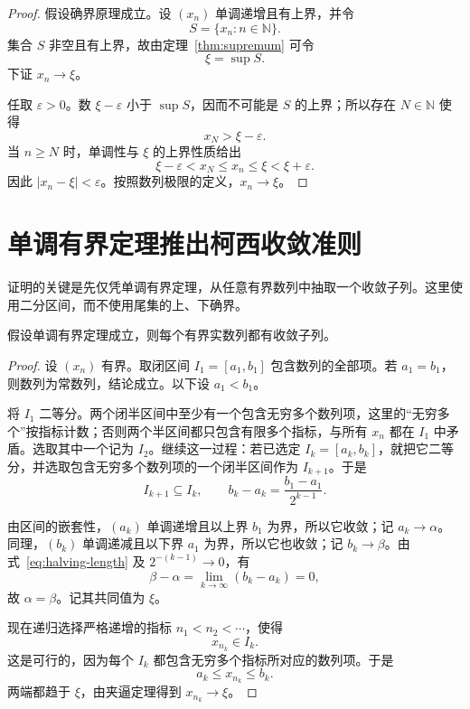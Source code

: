 \documentclass[UTF8,12pt,a4paper,fontset=fandol]{ctexart}
\begin{document}
\begin{proof}
  假设确界原理成立。设 $(x_n)$ 单调递增且有上界，并令
  \[
    S=\{x_n:n\in\mathbb N\}.
  \]
  集合 $S$ 非空且有上界，故由定理~\ref{thm:supremum} 可令
  \[
    \xi=\sup S.
  \]
  下证 $x_n\to\xi$。

  任取 $\varepsilon>0$。数 $\xi-\varepsilon$ 小于 $\sup S$，因而不可能是 $S$ 的上界；所以存在 $N\in\mathbb N$ 使得
  \[
    x_N>\xi-\varepsilon.
  \]
  当 $n\geq N$ 时，单调性与 $\xi$ 的上界性质给出
  \[
    \xi-\varepsilon<x_N\leq x_n\leq\xi<\xi+\varepsilon.
  \]
  因此 $|x_n-\xi|<\varepsilon$。按照数列极限的定义，$x_n\to\xi$。
\end{proof}

\section{单调有界定理推出柯西收敛准则}

证明的关键是先仅凭单调有界定理，从任意有界数列中抽取一个收敛子列。这里使用二分区间，而不使用尾集的上、下确界。

\begin{lemma}[有界数列的收敛子列]
  \label{lem:bounded-subsequence}
  假设单调有界定理成立，则每个有界实数列都有收敛子列。
\end{lemma}

\begin{proof}
  设 $(x_n)$ 有界。取闭区间 $I_1=[a_1,b_1]$ 包含数列的全部项。若 $a_1=b_1$，则数列为常数列，结论成立。以下设 $a_1<b_1$。

  将 $I_1$ 二等分。两个闭半区间中至少有一个包含无穷多个数列项，这里的“无穷多个”按指标计数；否则两个半区间都只包含有限多个指标，与所有 $x_n$ 都在 $I_1$ 中矛盾。选取其中一个记为 $I_2$。继续这一过程：若已选定 $I_k=[a_k,b_k]$，就把它二等分，并选取包含无穷多个数列项的一个闭半区间作为 $I_{k+1}$。于是
  \begin{equation}
    I_{k+1}\subseteq I_k,
    \qquad
    b_k-a_k=\frac{b_1-a_1}{2^{k-1}}.
    \label{eq:halving-length}
  \end{equation}

  由区间的嵌套性，$(a_k)$ 单调递增且以上界 $b_1$ 为界，所以它收敛；记 $a_k\to\alpha$。同理，$(b_k)$ 单调递减且以下界 $a_1$ 为界，所以它也收敛；记 $b_k\to\beta$。由式~\eqref{eq:halving-length} 及 $2^{-(k-1)}\to0$，有
  \[
    \beta-\alpha
    =\lim_{k\to\infty}(b_k-a_k)=0,
  \]
  故 $\alpha=\beta$。记其共同值为 $\xi$。

  现在递归选择严格递增的指标 $n_1<n_2<\cdots$，使得
  \[
    x_{n_k}\in I_k.
  \]
  这是可行的，因为每个 $I_k$ 都包含无穷多个指标所对应的数列项。于是
  \[
    a_k\leq x_{n_k}\leq b_k.
  \]
  两端都趋于 $\xi$，由夹逼定理得到 $x_{n_k}\to\xi$。
\end{proof}
\end{document}
